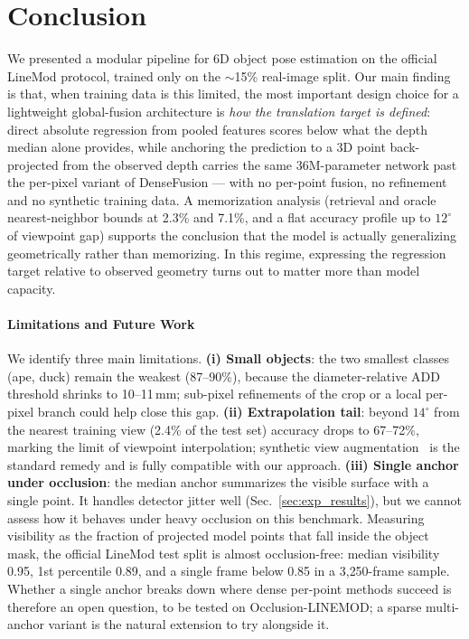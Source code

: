 \section{Conclusion}
\label{sec:conclusion}

We presented a modular pipeline for 6D object pose estimation on the official LineMod protocol, trained only on the $\sim$15\% real-image split. Our main finding is that, when training data is this limited, the most important design choice for a lightweight global-fusion architecture is \emph{how the translation target is defined}: direct absolute regression from pooled features scores below what the depth median alone provides, while anchoring the prediction to a 3D point back-projected from the observed depth carries the same 36M-parameter network past the per-pixel variant of DenseFusion --- with no per-point fusion, no refinement and no synthetic training data. A memorization analysis (retrieval and oracle nearest-neighbor bounds at 2.3\% and 7.1\%, and a flat accuracy profile up to $12^\circ$ of viewpoint gap) supports the conclusion that the model is actually generalizing geometrically rather than memorizing. In this regime, expressing the regression target relative to observed geometry turns out to matter more than model capacity.

\paragraph{Limitations and Future Work}
We identify three main limitations. \textbf{(i) Small objects}: the two smallest classes (ape, duck) remain the weakest (87--90\%), because the diameter-relative ADD threshold shrinks to 10--11\,mm; sub-pixel refinements of the crop or a local per-pixel branch could help close this gap. \textbf{(ii) Extrapolation tail}: beyond $14^\circ$ from the nearest training view (2.4\% of the test set) accuracy drops to 67--72\%, marking the limit of viewpoint interpolation; synthetic view augmentation~\cite{he2020pvn3d, he2021ffb6d} is the standard remedy and is fully compatible with our approach. \textbf{(iii) Single anchor under occlusion}: the median anchor summarizes the visible surface with a single point. It handles detector jitter well (Sec.~\ref{sec:exp_results}), but we cannot assess how it behaves under heavy occlusion on this benchmark. Measuring visibility as the fraction of projected model points that fall inside the object mask, the official LineMod test split is almost occlusion-free: median visibility 0.95, 1st percentile 0.89, and a single frame below 0.85 in a 3{,}250-frame sample. Whether a single anchor breaks down where dense per-point methods succeed is therefore an open question, to be tested on Occlusion-LINEMOD; a sparse multi-anchor variant is the natural extension to try alongside it.

